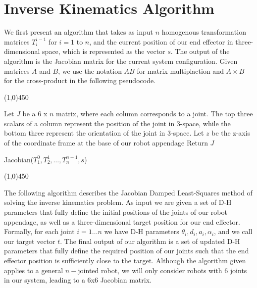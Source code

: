 \section{Inverse Kinematics Algorithm}
We first present an algorithm that takes as input $n$ homogenous transformation matrices $T^{i-1}_i$ for $i=1$ to $n$, and
the current position of our end effector in three-dimensional space, which is represented as the vector $s$. 
The output of the algorithm is the Jacobian matrix for the current system configuration. Given matrices $A$ and $B$, we use the notation
$AB$ for matrix multiplaction and $A \times B$ for the cross-product in the following pseudocode.\\

\begin{center}
\line(1,0){450}
\end{center}
\begin{algorithm}[H]
\DontPrintSemicolon
Let $J$ be a 6 x $n$ matrix, where each column corresponds to a joint. The top three scalars of a column represent the
position of the joint in 3-space, while the bottom three represent the orientation of the joint in 3-space.\;
Let $z$ be the z-axis of the coordinate frame at the base of our robot appendage\;
Return $J$
\caption{Jacobian($T^0_1, T^1_2, \ldots, T^{n-1}_n, s$)\label{IR}}
\begin{center}
\noindent\line(1,0){450}
\end{center}
\end{algorithm}
\vspace{2mm}

The following algorithm describes the Jacobian Damped Least-Squares method of solving the inverse kinematics problem. 
As input we are given a set of D-H parameters that fully define
the initial positions of the joints of our robot appendage, as well as a three-dimensional target position for our end effector. 
Formally, for each joint $i = 1 \ldots n$ we have D-H parameters $\theta_i, d_i, a_i, \alpha_i$, and
we call our target vector $t$. The final output of our algorithm is a set of updated D-H parameters that fully define
the required position of our joints such that the end effector position is sufficiently close to the target.
Although the algorithm given applies to a general $n-$jointed robot, we will only consider robots with 6 joints in our system, leading
to a 6x6 Jacobian matrix.


